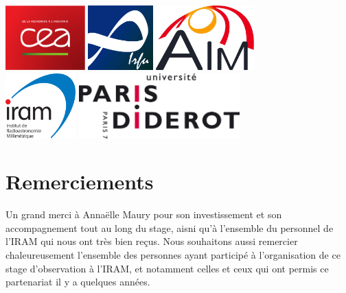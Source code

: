 \documentclass[a4paper,10pt,french]{article}
\begin{document}
\begin{center}
    \vspace{0.5cm}

    \hfill \includegraphics[height=2.5cm]{logo_cea.pdf} \hfill \includegraphics[height=2.5cm]{logo_irfu.png} \hfill \includegraphics[height=2.5cm]{logo_aim.jpg} \hfill \null \\
    \vspace{0.5cm}
    \hfill \includegraphics[height=2.5cm]{logo_iram.png} \hfill \includegraphics[height=2.5cm]{logo_upd.png} \hfill \null \\

\end{center}

\vfill
\hfill \thedate

\newpage

\thispagestyle{empty}

\section*{Remerciements}
Un grand merci à Annaëlle Maury pour son investissement et son accompagnement tout au long du stage, aisni qu'à l'ensemble du personnel de l'IRAM qui nous ont très bien reçus.
Nous souhaitons aussi remercier chaleureusement l'ensemble des personnes ayant participé à l'organisation de ce stage d'observation à l'IRAM, et notamment celles et ceux qui ont permis ce partenariat il y a quelques années.
\end{document}

